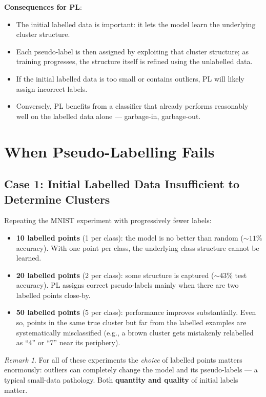 \documentclass[11pt,a4paper]{article}
\theoremstyle{definition}
\theoremstyle{plain}
\theoremstyle{remark}
\newtheorem*{remark}{Remark}
\begin{document}
\textbf{Consequences for PL}:
\begin{itemize}
    \item The initial labelled data is important: it lets the model learn the underlying cluster structure.
    \item Each pseudo-label is then assigned by exploiting that cluster structure; as training progresses, the structure itself is refined using the unlabelled data.
    \item If the initial labelled data is too small or contains outliers, PL will likely assign incorrect labels.
    \item Conversely, PL benefits from a classifier that already performs reasonably well on the labelled data alone --- garbage-in, garbage-out.
\end{itemize}


\section{When Pseudo-Labelling Fails}

\subsection{Case 1: Initial Labelled Data Insufficient to Determine Clusters}

Repeating the MNIST experiment with progressively fewer labels:

\begin{itemize}
    \item \textbf{10 labelled points} (1 per class): the model is no better than random ($\sim 11$\% accuracy). With one point per class, the underlying class structure cannot be learned.
    \item \textbf{20 labelled points} (2 per class): some structure is captured ($\sim 43$\% test accuracy). PL assigns correct pseudo-labels mainly when there are two labelled points close-by.
    \item \textbf{50 labelled points} (5 per class): performance improves substantially. Even so, points in the same true cluster but far from the labelled examples are systematically misclassified (e.g., a brown cluster gets mistakenly relabelled as ``4'' or ``7'' near its periphery).
\end{itemize}

\begin{remark}
For all of these experiments the \emph{choice} of labelled points matters enormously: outliers can completely change the model and its pseudo-labels --- a typical small-data pathology. Both \textbf{quantity and quality} of initial labels matter.
\end{remark}
\end{document}
